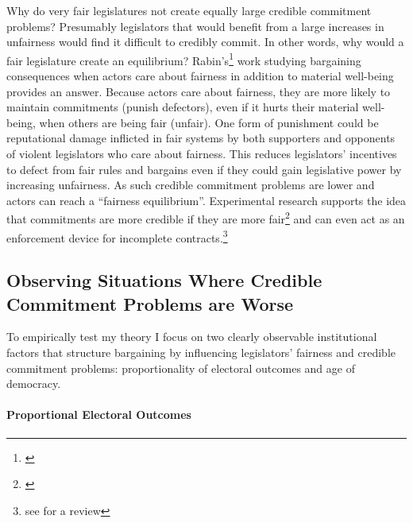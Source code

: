 \documentclass[a4paper]{article}\usepackage[]{graphicx}\usepackage[]{color}
\begin{document}
Why do very fair legislatures not create equally large credible commitment problems? Presumably legislators that would benefit from a large increases in unfairness would find it difficult to credibly commit. In other words, why would a fair legislature create an equilibrium? Rabin's\footnote{\citealt{Rabin1993}} work studying bargaining consequences when actors care about fairness in addition to material well-being provides an answer. Because actors care about fairness, they are more likely to maintain commitments (punish defectors), even if it hurts their material well-being, when others are being fair (unfair). One form of punishment could be reputational damage inflicted in fair systems by both supporters and opponents of violent legislators who care about fairness. This reduces legislators' incentives to defect from fair rules and bargains even if they could gain legislative power by increasing unfairness. As such credible commitment problems are lower and actors can reach a ``fairness equilibrium''. Experimental research supports the idea that commitments are more credible if they are more fair\footnote{\citealt{Ellingsen2004}} and can even act as an enforcement device for incomplete contracts.\footnote{see \citealt{Fehr2008} for a review}  

\subsection{Observing Situations Where Credible Commitment Problems are Worse}

To empirically test my theory I focus on two clearly observable institutional factors that structure bargaining by influencing legislators' fairness and credible commitment problems: proportionality of electoral outcomes and age of democracy.

\paragraph{Proportional Electoral Outcomes}
\end{document}
